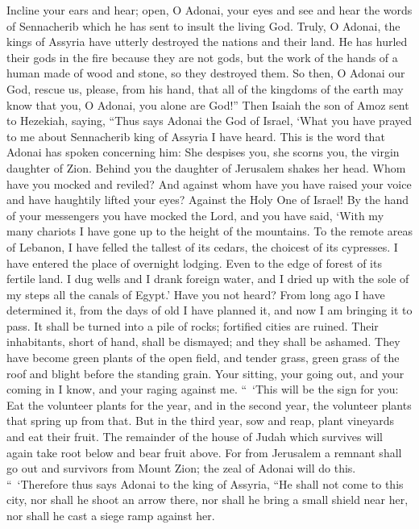 \begin{biblechapter}
\verse Incline your ears and hear; open, O Adonai, your eyes and see and hear the words of Sennacherib which he has sent to insult the living God.
\verse Truly, O Adonai, the kings of Assyria have utterly destroyed the nations and their land.
\verse He has hurled their gods in the fire because they are not gods, but the work of the hands of a human made of wood and stone, so they destroyed them.
\verse So then, O Adonai our God, rescue us, please, from his hand, that all of the kingdoms of the earth may know that you, O Adonai, you alone are God!”
 Then Isaiah the son of Amoz sent to Hezekiah, saying, “Thus says Adonai the God of Israel, ‘What you have prayed to me about Sennacherib king of Assyria I have heard.
\verse This is the word that Adonai has spoken concerning him:
\verse She despises you, she scorns you, 
the virgin daughter of Zion. 
Behind you the daughter of Jerusalem 
shakes her head.
\verse Whom have you mocked and reviled? 
And against whom have you have raised your voice 
and have haughtily lifted your eyes? 
Against the Holy One of Israel!
\verse By the hand of your messengers you have mocked the Lord, 
and you have said, 
‘With my many chariots I have gone up 
to the height of the mountains. 
To the remote areas of Lebanon, 
I have felled the tallest of its cedars, 
the choicest of its cypresses. 
I have entered the place of overnight lodging. 
Even to the edge of forest of its fertile land.
\verse I dug wells and I drank foreign water, 
and I dried up with the sole of my steps 
all the canals of Egypt.’
\verse Have you not heard? 
From long ago I have determined it, 
from the days of old I have planned it, 
and now I am bringing it to pass. 
It shall be turned into a pile of rocks; 
fortified cities are ruined.
\verse Their inhabitants, short of hand, shall be dismayed; 
and they shall be ashamed. 
They have become green plants of the open field, 
and tender grass, 
green grass of the roof 
and blight before the standing grain.
\verse Your sitting, your going out, and your coming in I know, 
and your raging against me.
\verse “ ‘This will be the sign for you: Eat the volunteer plants for the year, and in the second year, the volunteer plants that spring up from that. But in the third year, sow and reap, plant vineyards and eat their fruit.
\verse The remainder of the house of Judah which survives will again take root below and bear fruit above.
\verse For from Jerusalem a remnant shall go out and survivors from Mount Zion; the zeal of Adonai will do this.
\verse “ ‘Therefore thus says Adonai to the king of Assyria, “He shall not come to this city, nor shall he shoot an arrow there, nor shall he bring a small shield near her, nor shall he cast a siege ramp against her.

\end{biblechapter}
